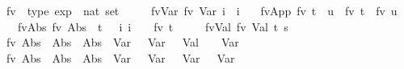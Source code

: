 \begin{isabellebody}
\isamarkupfalse%
\ fv\ {\isacharcolon}{\kern0pt}{\isacharcolon}{\kern0pt}\ {\isachardoublequoteopen}type\ exp\ {\isacharequal}{\kern0pt}{\isachargreater}{\kern0pt}\ nat\ set{\isachardoublequoteclose}\ \isanewline
\ \ \ \ fv{\isacharunderscore}{\kern0pt}Var{\isacharcolon}{\kern0pt}\ {\isachardoublequoteopen}fv\ {\isacharparenleft}{\kern0pt}Var\ i{\isacharparenright}{\kern0pt}\ {\isacharequal}{\kern0pt}\ {\isacharbraceleft}{\kern0pt}i{\isacharbraceright}{\kern0pt}{\isachardoublequoteclose}\isanewline
\ \ {\isacharbar}{\kern0pt}\ fv{\isacharunderscore}{\kern0pt}App{\isacharcolon}{\kern0pt}\ {\isachardoublequoteopen}fv\ {\isacharparenleft}{\kern0pt}t\ {\isasymcdot}\ u{\isacharparenright}{\kern0pt}\ {\isacharequal}{\kern0pt}\ fv\ t\ {\isasymunion}\ fv\ u{\isachardoublequoteclose}\isanewline
\ \ {\isacharbar}{\kern0pt}\ fv{\isacharunderscore}{\kern0pt}Abs{\isacharcolon}{\kern0pt}\ {\isachardoublequoteopen}fv\ {\isacharparenleft}{\kern0pt}Abs\ {\isasymtau}{\isacharprime}{\kern0pt}\ t{\isacharparenright}{\kern0pt}\ {\isacharequal}{\kern0pt}\ {\isacharparenleft}{\kern0pt}{\isasymlambda}\ i{\isachardot}{\kern0pt}\ i\ {\isacharminus}{\kern0pt}\ {}{\isacharparenright}{\kern0pt}\ {\isacharbackquote}{\kern0pt}\ {\isacharparenleft}{\kern0pt}fv\ t\ {\isacharminus}{\kern0pt}\ {\isacharbraceleft}{\kern0pt}{}{\isacharbraceright}{\kern0pt}{\isacharparenright}{\kern0pt}{\isachardoublequoteclose}\isanewline
\ \ {\isacharbar}{\kern0pt}\ fv{\isacharunderscore}{\kern0pt}Val{\isacharcolon}{\kern0pt}\ {\isachardoublequoteopen}fv\ {\isacharparenleft}{\kern0pt}Val\ t\ s{\isacharparenright}{\kern0pt}\ {\isacharequal}{\kern0pt}\ {\isacharbraceleft}{\kern0pt}{\isacharbraceright}{\kern0pt}{\isachardoublequoteclose}\isanewline
\isanewline
\isanewline
\isanewline
{}\isamarkupfalse%
\ {\isachardoublequoteopen}fv\ {\isacharparenleft}{\kern0pt}Abs\ {\isasymtau}{\isacharprime}{\kern0pt}\ {\isacharparenleft}{\kern0pt}Abs\ {\isasymtau}{\isacharprime}{\kern0pt}\ {\isacharparenleft}{\kern0pt}Abs\ {\isasymtau}{\isacharprime}{\kern0pt}\ {\isacharparenleft}{\kern0pt}Var\ {}\ {\isasymcdot}\ {\isacharparenleft}{\kern0pt}Var\ {}\ {\isasymcdot}\ Val\ {}\ {}\ {\isasymcdot}\ Var\ {}{\isacharparenright}{\kern0pt}{\isacharparenright}{\kern0pt}{\isacharparenright}{\kern0pt}{\isacharparenright}{\kern0pt}{\isacharparenright}{\kern0pt}{\isachardoublequoteclose}\isanewline
{}\isamarkupfalse%
\ {\isachardoublequoteopen}fv\ {\isacharparenleft}{\kern0pt}Abs\ {\isasymtau}{\isacharprime}{\kern0pt}\ {\isacharparenleft}{\kern0pt}Abs\ {\isasymtau}{\isacharprime}{\kern0pt}\ {\isacharparenleft}{\kern0pt}Abs\ {\isasymtau}{\isacharprime}{\kern0pt}\ {\isacharparenleft}{\kern0pt}Var\ {}\ {\isasymcdot}\ Var\ {}\ {\isasymcdot}\ {\isacharparenleft}{\kern0pt}Var\ {}\ {\isasymcdot}\ Var\ {}{\isacharparenright}{\kern0pt}{\isacharparenright}{\kern0pt}{\isacharparenright}{\kern0pt}{\isacharparenright}{\kern0pt}{\isacharparenright}{\kern0pt}{\isachardoublequoteclose}\isanewline

\end{isabellebody}
